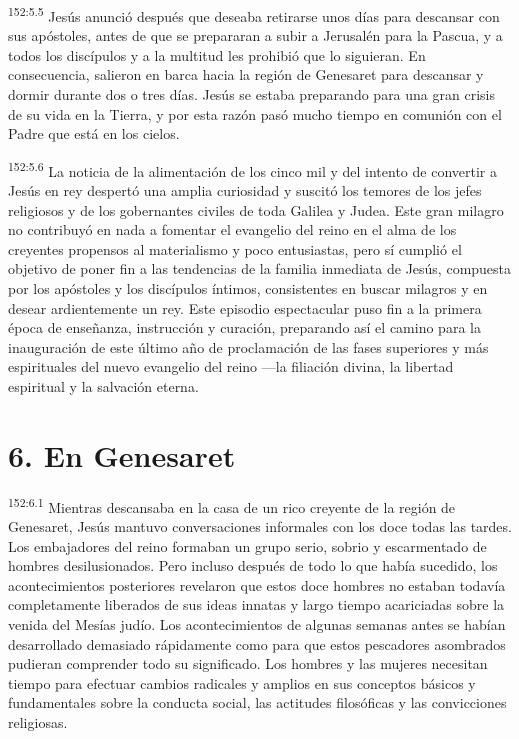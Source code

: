 \par 
\textsuperscript{152:5.5} Jesús anunció después que deseaba retirarse unos días para descansar con sus apóstoles, antes de que se prepararan a subir a Jerusalén para la Pascua, y a todos los discípulos y a la multitud les prohibió que lo siguieran. En consecuencia, salieron en barca hacia la región de Genesaret para descansar y dormir durante dos o tres días. Jesús se estaba preparando para una gran crisis de su vida en la Tierra, y por esta razón pasó mucho tiempo en comunión con el Padre que está en los cielos.

\par 
\textsuperscript{152:5.6} La noticia de la alimentación de los cinco mil y del intento de convertir a Jesús en rey despertó una amplia curiosidad y suscitó los temores de los jefes religiosos y de los gobernantes civiles de toda Galilea y Judea. Este gran milagro no contribuyó en nada a fomentar el evangelio del reino en el alma de los creyentes propensos al materialismo y poco entusiastas, pero sí cumplió el objetivo de poner fin a las tendencias de la familia inmediata de Jesús, compuesta por los apóstoles y los discípulos íntimos, consistentes en buscar milagros y en desear ardientemente un rey. Este episodio espectacular puso fin a la primera época de enseñanza, instrucción y curación, preparando así el camino para la inauguración de este último año de proclamación de las fases superiores y más espirituales del nuevo evangelio del reino ---la filiación divina, la libertad espiritual y la salvación eterna.

\section*{6. En Genesaret}
\par 
\textsuperscript{152:6.1} Mientras descansaba en la casa de un rico creyente de la región de Genesaret, Jesús mantuvo conversaciones informales con los doce todas las tardes. Los embajadores del reino formaban un grupo serio, sobrio y escarmentado de hombres desilusionados. Pero incluso después de todo lo que había sucedido, los acontecimientos posteriores revelaron que estos doce hombres no estaban todavía completamente liberados de sus ideas innatas y largo tiempo acariciadas sobre la venida del Mesías judío. Los acontecimientos de algunas semanas antes se habían desarrollado demasiado rápidamente como para que estos pescadores asombrados pudieran comprender todo su significado. Los hombres y las mujeres necesitan tiempo para efectuar cambios radicales y amplios en sus conceptos básicos y fundamentales sobre la conducta social, las actitudes filosóficas y las convicciones religiosas.

